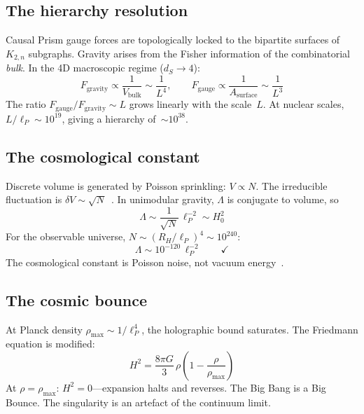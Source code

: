 \documentclass[aps,prd,twocolumn,superscriptaddress,nofootinbib,amsmath,amssymb,longbibliography]{revtex4-2}
\newcommand{\lp}{\ell_P}
\newcommand{\ds}{d_S}
\newcommand{\Kbn}{K_{2,n}}
\begin{document}
\subsection{The hierarchy resolution}

Causal Prism gauge forces are topologically locked to the bipartite
surfaces of $\Kbn$ subgraphs.
Gravity arises from the Fisher information of the combinatorial
\emph{bulk}.
In the 4D macroscopic regime ($\ds \to 4$):
\begin{equation}
  F_{\text{gravity}} \propto \frac{1}{V_{\text{bulk}}} \sim \frac{1}{L^4},
  \qquad
  F_{\text{gauge}} \propto \frac{1}{A_{\text{surface}}} \sim \frac{1}{L^3}
\end{equation}
The ratio $F_{\text{gauge}}/F_{\text{gravity}} \sim L$ grows linearly
with the scale~$L$.  At nuclear scales, $L/\lp \sim 10^{19}$, giving a
hierarchy of~${\sim}10^{38}$.

\subsection{The cosmological constant}

Discrete volume is generated by Poisson sprinkling: $V \propto N$.
The irreducible fluctuation is $\delta V \sim \sqrt{N}$~\cite{ahmed2004}.
In unimodular gravity, $\Lambda$ is conjugate to volume, so
\begin{equation}\label{eq:lambda}
  \Lambda \sim \frac{1}{\sqrt{N}}\,\lp^{-2} \sim H_0^2
\end{equation}
For the observable universe, $N \sim (R_H/\lp)^4 \sim 10^{240}$:
\begin{equation}
  \Lambda \sim 10^{-120}\,\lp^{-2}
  \qquad\checkmark
\end{equation}
The cosmological constant is Poisson noise, not vacuum energy~\cite{ahmed2004,weinberg1989}.

\subsection{The cosmic bounce}

At Planck density $\rho_{\max} \sim 1/\lp^4$, the holographic bound
saturates.
The Friedmann equation is modified:
\begin{equation}
  H^2 = \frac{8\pi G}{3}\,\rho\left(1 - \frac{\rho}{\rho_{\max}}\right)
\end{equation}
At $\rho = \rho_{\max}$: $H^2 = 0$---expansion halts and reverses.
The Big Bang is a Big Bounce.
The singularity is an artefact of the continuum limit.
\end{document}
